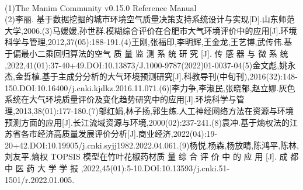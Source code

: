 \documentclass[preview]{standalone}
\begin{document}
\begin{center}
\quad\\(1)The Manim Community v0.15.0 Reference Manual\quad\\(2)李丽. 基于数据挖掘的城市环境空气质量决策支持系统设计与实现[D].山东师范大学,2006.(3)马媛媛,孙世群.模糊综合评价在合肥市大气环境评价中的应用[J].环境科学与管理,2012,37(05):188-191.(4)王刚,张福印,李明辉,王金龙,王艺博,武传伟.基于偏最小二乘回归算法的空气 质 量 监 测 系 统 研 究 [J]. 传 感 器 与 微 系 统 ,2022,41(01):37-40+49.DOI:10.13873/J.1000-9787(2022)01-0037-04(5)金文彪,姚永杰,金哲植.基于主成分分析的大气环境预测研究[J].科教导刊(中旬刊),2016(32):148-150.DOI:10.16400/j.cnki.kjdkz.2016.11.071.(6)]李力争,李淑民,张晓郁,赵立娜.灰色系统在大气环境质量评价及变化趋势研究中的应用[J].环境科学与管理,2013,38(01):177-180.(7)邬红娟,林子扬,郭生练.人工神经网络方法在资源与环境预测方面的应用[J].长江流域资源与环境,2000(02):237-241.(8)袁冲.基于熵权法的江苏省各市经济高质量发展评价分析[J].商业经济,2022(04):19-20+42.DOI:10.19905/j.cnki.syjj1982.2022.04.061.(9)杨悦,杨森,杨放晴,陈鸿平,陈林,刘友平.熵权 TOPSIS 模型在竹叶花椒药材质 量 综 合 评 价 中 的 应 用 [J]. 成 都 中 医 药 大 学 学 报 ,2022,45(01):5-10.DOI:10.13593/j.cnki.51-1501/r.2022.01.005.
\end{center}
\end{document}
